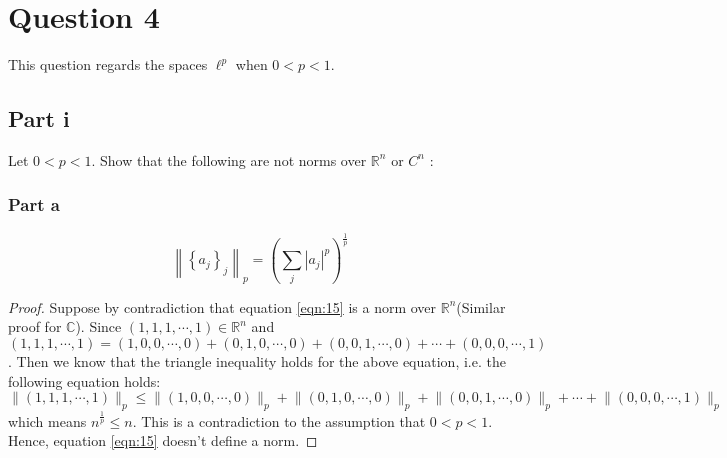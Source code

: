 \section{Question 4}

\begin{question}
   This question regards the spaces $\ell^p$ when $0<p<1$.
\end{question}

\subsection{Part i}

\begin{question}
    Let $0<p<1$. Show that the following are not norms over $\mathbb{R}^n$ or $C^n$ :
\end{question}

\subsubsection{Part a}

\begin{question}
    \begin{equation}\label{eqn:15}
        \left\|\left\{a_j\right\}_j\right\|_p=\left(\sum_j\left|a_j\right|^p\right)^{\frac{1}{p}}
    \end{equation}
\end{question}

\begin{answer}
    \begin{proof}
        Suppose by contradiction that equation \ref{eqn:15} is a norm over $\mathbb{R}^n$(Similar proof for $\mathbb{C}$). Since $(1,1,1,\cdots,1) \in \mathbb{R}^n$ and $(1,1,1,\cdots,1) = (1,0,0,\cdots,0) + (0,1,0,\cdots,0) + (0,0,1,\cdots,0) + \cdots + (0,0,0,\cdots,1)$. Then we know that the triangle inequality holds for the above equation, i.e. the following equation holds:
        \begin{equation}
            \lVert (1,1,1,\cdots,1) \rVert_p \leq \lVert(1,0,0,\cdots,0)\rVert_p + \lVert(0,1,0,\cdots,0)\rVert_p + \lVert(0,0,1,\cdots,0)\rVert_p + \cdots + \lVert(0,0,0,\cdots,1)\rVert_p
        \end{equation}
        which means $n^{\frac{1}{p}} \leq n$. This is a contradiction to the assumption that $0 < p < 1$. Hence, equation \ref{eqn:15} doesn't define a norm.
    \end{proof}
\end{answer}

